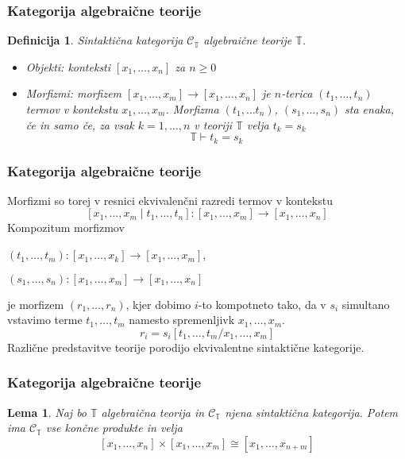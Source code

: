 \documentclass{beamer}
\newtheorem{lema}[theorem]{Lema}
\newtheorem{definicija}{Definicija}
\begin{document}
\begin{frame}
\frametitle{Kategorija algebraične teorije}
\begin{definicija}
\emph{Sintaktična kategorija} $\mathcal{C}_\mathbb{T}$ algebraične teorije $\mathbb{T}$.
\pause
\begin{itemize}
\item Objekti: konteksti $[x_1, \ldots, x_n]$ za $n \geq 0$
\pause
\item Morfizmi: morfizem $[x_1, \ldots, x_m] \to [x_1, \ldots, x_n]$ je $n$-terica $(t_1, \ldots, t_n)$ termov v kontekstu $x_1, \ldots, x_m$. Morfizma $(t_1, \ldots t_n)$, $(s_1, \ldots, s_n)$ sta enaka, če in samo če, za vsak $k = 1, \ldots, n$ v teoriji $\mathbb{T}$ velja $t_k = s_k$
$$\mathbb{T} \vdash t_k = s_k$$
\end{itemize}
\end{definicija}
\end{frame}

\begin{frame}
\frametitle{Kategorija algebraične teorije}
Morfizmi so torej v resnici ekvivalenčni razredi termov v kontekstu
$$[x_1, \ldots, x_m \mid t_1, \ldots, t_n] : [x_1, \ldots, x_m] \to [x_1, \ldots, x_n]$$
\pause
Kompozitum morfizmov
\begin{center}
\begin{description}
\item $(t_1, \ldots, t_m) : [x_1, \ldots, x_k] \to [x_1, \ldots, x_m]$,
\item $(s_1, \ldots, s_n) : [x_1, \ldots, x_m] \to [x_1, \ldots, x_n]$
\end{description}
\end{center}
je morfizem $(r_1, \ldots, r_n)$, kjer dobimo $i$-to kompotneto tako, da v $s_i$ simultano vstavimo terme $t_1, \ldots, t_m$ namesto spremenljivk $x_1, \ldots, x_m$.
$$r_i = s_i[t_1, \ldots, t_m / x_1, \ldots, x_m]$$
\pause
Različne predstavitve teorije porodijo ekvivalentne sintaktične kategorije.
\end{frame}

\begin{frame}
\frametitle{Kategorija algebraične teorije}
\begin{lema}
Naj bo $\mathbb{T}$ algebraična teorija in $\mathcal{C}_\mathbb{T}$ njena sintaktična kategorija. Potem ima $\mathcal{C}_\mathbb{T}$ vse končne produkte in velja
$$[x_1, \ldots, x_n] \times [x_1, \ldots, x_m] \cong [x_1, \ldots, x_{n+m}]$$
\end{lema}
\end{frame}
\end{document}
